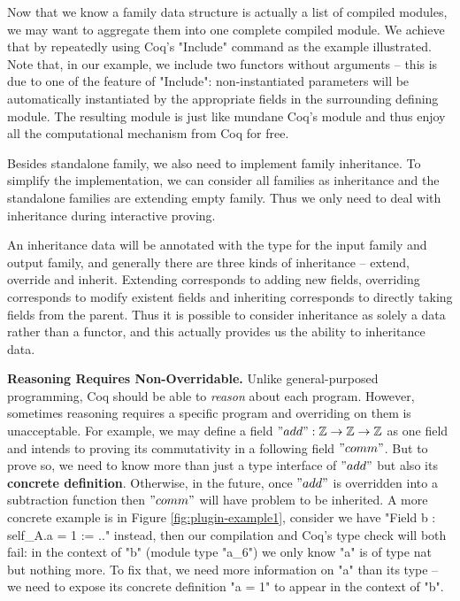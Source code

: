 Now that we know a family data structure is actually a list of compiled modules, we may want to aggregate them into one complete compiled module. We achieve that by repeatedly using Coq's "Include" command as the example illustrated. Note that, in our example, we include two functors without arguments -- this is due to one of the feature of "Include": non-instantiated parameters will be automatically instantiated by the appropriate fields in the surrounding defining module. The resulting module is just like mundane Coq's module and thus enjoy all the computational mechanism from Coq for free. 



Besides standalone family, we also need to implement family inheritance. To simplify the implementation, we can consider all families as inheritance and the standalone families are extending empty family. Thus we only need to deal with inheritance during interactive proving. 

An inheritance data will be annotated with the type for the input family and output family, and generally there are three kinds of inheritance -- extend, override and inherit. Extending corresponds to adding new fields, overriding corresponds to modify existent fields and inheriting corresponds to directly taking fields from the parent. Thus it is possible to consider inheritance as solely a data rather than a functor, and this actually provides us the ability to  inheritance data. 




\textbf{Reasoning Requires Non-Overridable.}
Unlike general-purposed programming, Coq should be able to  \textit{reason} about each program. However, sometimes reasoning requires a specific program and overriding on them is unacceptable. For example, we may define a field $"add" : \mathbb{Z} \to \mathbb{Z} \to \mathbb{Z}$ as one field and intends to proving its commutativity in a following field $"comm"$. But to prove so, we need to know more than just a type interface of $"add"$ but also its \textbf{concrete definition}. Otherwise, in the future, once $"add"$ is overridden into a subtraction function then $"comm"$ will have problem to be  inherited. A more concrete example is in Figure \ref*{fig:plugin-example1}, consider we have "Field b : self_A.a = 1 := .." instead, then our compilation and Coq's type check will both fail: in the context of "b" (module type "a_6") we only know "a" is of type nat but nothing more.  To fix that, we need more information on "a" than its type -- we need to expose its concrete definition "a = 1" to appear in the context of "b".

